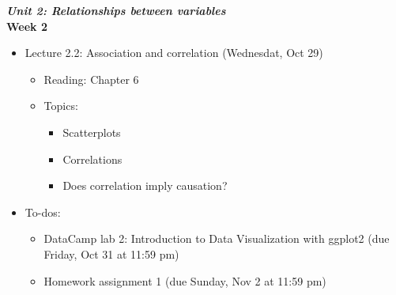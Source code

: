 \documentclass[11pt]{article}
\begin{document}
\Large \textit{\textbf{Unit 2: Relationships between variables}} \\

\large \textbf{Week 2}
\begin{itemize}
    \item Lecture 2.2: Association and correlation (Wednesdat, Oct 29)
    \begin{itemize}
        \item Reading: Chapter 6
        \item Topics:
        \begin{itemize}
            \item Scatterplots
            \item Correlations
            \item Does correlation imply causation?
        \end{itemize}
    \end{itemize}
    \item To-dos:
    \begin{itemize}
        \item DataCamp lab 2: Introduction to Data Visualization with ggplot2 (due Friday, Oct 31 at 11:59 pm)
        \item Homework assignment 1 (due Sunday, Nov 2 at 11:59 pm)
    \end{itemize}
\end{itemize}
\end{document}
